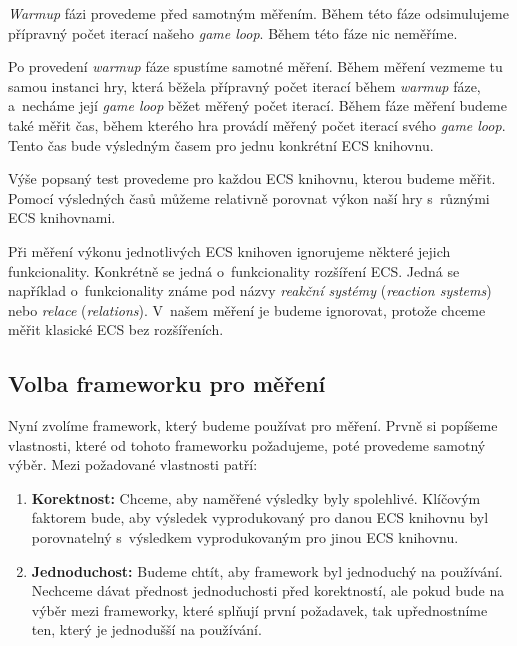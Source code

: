 \textit{Warmup} fázi provedeme před samotným měřením. Během této fáze odsimulujeme přípravný počet iterací našeho \textit{game loop}. Během této fáze nic neměříme.

Po provedení \textit{warmup} fáze spustíme samotné měření. Během měření vezmeme tu samou instanci hry, která běžela přípravný počet iterací během \textit{warmup} fáze, a~necháme její \textit{game loop} běžet měřený počet iterací. Během fáze měření budeme také měřit čas, během kterého hra provádí měřený počet iterací svého \textit{game loop}. Tento čas bude výsledným časem pro jednu konkrétní ECS knihovnu.


Výše popsaný test provedeme pro každou ECS knihovnu, kterou budeme měřit. Pomocí výsledných časů můžeme relativně porovnat výkon naší hry s~různými ECS knihovnami. 

Při měření výkonu jednotlivých ECS knihoven ignorujeme některé jejich funkcionality. Konkrétně se jedná o~funkcionality rozšíření ECS. Jedná se například o~funkcionality známe pod názvy \textit{reakční systémy} (\textit{reaction systems}) nebo \textit{relace} ({\textit{relations}}). V~našem měření je budeme ignorovat, protože chceme měřit klasické ECS bez rozšířeních.

\subsection{Volba frameworku pro měření}
\label{benchmark-framework}
Nyní zvolíme framework, který budeme používat pro měření. Prvně si popíšeme vlastnosti, které od tohoto frameworku požadujeme, poté provedeme samotný výběr. Mezi požadované vlastnosti patří:

\begin{enumerate}
    \item \textbf{Korektnost:} Chceme, aby naměřené výsledky byly spolehlivé. Klíčovým faktorem bude, aby výsledek vyprodukovaný pro danou ECS knihovnu byl porovnatelný s~výsledkem vyprodukovaným pro jinou ECS knihovnu.
    \item \textbf{Jednoduchost:} Budeme chtít, aby framework byl jednoduchý na používání. Nechceme dávat přednost jednoduchosti před korektností, ale pokud bude na výběr mezi frameworky, které splňují první požadavek, tak upřednostníme ten, který je jednodušší na používání.
\end{enumerate}

